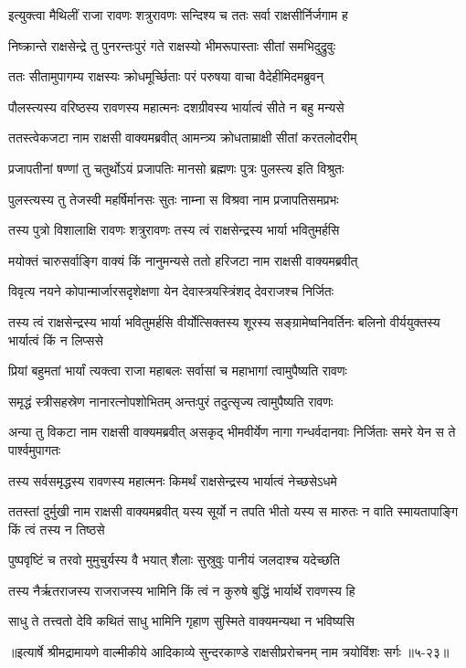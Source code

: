 
\twolineshloka
{इत्युक्त्वा मैथिलीं राजा रावणः शत्रुरावणः}
{सन्दिश्य च ततः सर्वा राक्षसीर्निर्जगाम ह} %

\twolineshloka
{निष्क्रान्ते राक्षसेन्द्रे तु पुनरन्तःपुरं गते}
{राक्षस्यो भीमरूपास्ताः सीतां समभिदुद्रुवुः} %

\twolineshloka
{ततः सीतामुपागम्य राक्षस्यः क्रोधमूर्च्छिताः}
{परं परुषया वाचा वैदेहीमिदमब्रुवन्} %

\twolineshloka
{पौलस्त्यस्य वरिष्ठस्य रावणस्य महात्मनः}
{दशग्रीवस्य भार्यात्वं सीते न बहु मन्यसे} %

\twolineshloka
{ततस्त्वेकजटा नाम राक्षसी वाक्यमब्रवीत्}
{आमन्त्र्य क्रोधताम्राक्षी सीतां करतलोदरीम्} %

\twolineshloka
{प्रजापतीनां षण्णां तु चतुर्थोऽयं प्रजापतिः}
{मानसो ब्रह्मणः पुत्रः पुलस्त्य इति विश्रुतः} %

\twolineshloka
{पुलस्त्यस्य तु तेजस्वी महर्षिर्मानसः सुतः}
{नाम्ना स विश्रवा नाम प्रजापतिसमप्रभः} %

\twolineshloka
{तस्य पुत्रो विशालाक्षि रावणः शत्रुरावणः}
{तस्य त्वं राक्षसेन्द्रस्य भार्या भवितुमर्हसि} %

\twolineshloka
{मयोक्तं चारुसर्वाङ्गि वाक्यं किं नानुमन्यसे}
{ततो हरिजटा नाम राक्षसी वाक्यमब्रवीत्} %

\twolineshloka
{विवृत्य नयने कोपान्मार्जारसदृशेक्षणा}
{येन देवास्त्रयस्त्रिंशद् देवराजश्च निर्जितः} %

\threelineshloka
{तस्य त्वं राक्षसेन्द्रस्य भार्या भवितुमर्हसि}
{वीर्योत्सिक्तस्य शूरस्य सङ्ग्रामेष्वनिवर्तिनः}
{बलिनो वीर्ययुक्तस्य भार्यात्वं किं न लिप्ससे} %

\twolineshloka
{प्रियां बहुमतां भार्यां त्यक्त्वा राजा महाबलः}
{सर्वासां च महाभागां त्वामुपैष्यति रावणः} %

\twolineshloka
{समृद्धं स्त्रीसहस्रेण नानारत्नोपशोभितम्}
{अन्तःपुरं तदुत्सृज्य त्वामुपैष्यति रावणः} %

\threelineshloka
{अन्या तु विकटा नाम राक्षसी वाक्यमब्रवीत्}
{असकृद् भीमवीर्येण नागा गन्धर्वदानवाः}
{निर्जिताः समरे येन स ते पार्श्वमुपागतः} %

\twolineshloka
{तस्य सर्वसमृद्धस्य रावणस्य महात्मनः}
{किमर्थं राक्षसेन्द्रस्य भार्यात्वं नेच्छसेऽधमे} %

\threelineshloka
{ततस्तां दुर्मुखी नाम राक्षसी वाक्यमब्रवीत्}
{यस्य सूर्यो न तपति भीतो यस्य स मारुतः}
{न वाति स्मायतापाङ्गि किं त्वं तस्य न तिष्ठसे} %

\twolineshloka
{पुष्पवृष्टिं च तरवो मुमुचुर्यस्य वै भयात्}
{शैलाः सुस्रुवुः पानीयं जलदाश्च यदेच्छति} %

\twolineshloka
{तस्य नैर्ऋतराजस्य राजराजस्य भामिनि}
{किं त्वं न कुरुषे बुद्धिं भार्यार्थे रावणस्य हि} %

\twolineshloka
{साधु ते तत्त्वतो देवि कथितं साधु भामिनि}
{गृहाण सुस्मिते वाक्यमन्यथा न भविष्यसि} %


॥इत्यार्षे श्रीमद्रामायणे वाल्मीकीये आदिकाव्ये सुन्दरकाण्डे राक्षसीप्ररोचनम् नाम त्रयोविंशः सर्गः ॥५-२३॥
